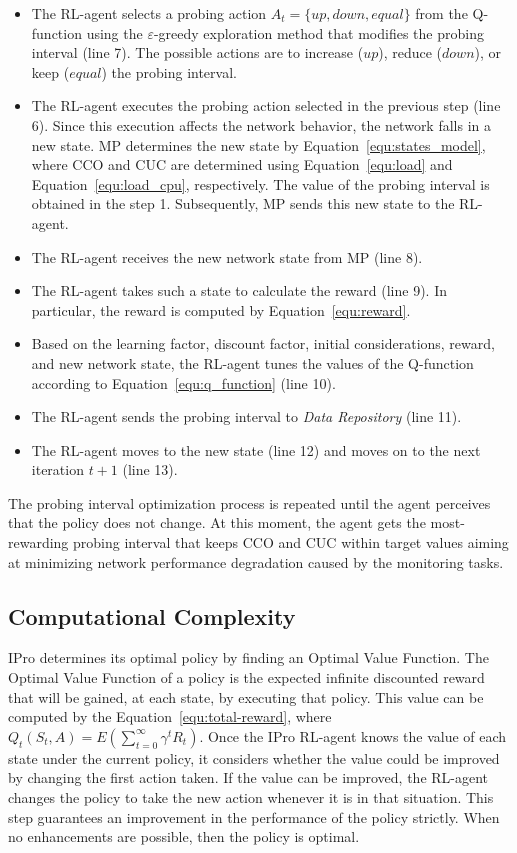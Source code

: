\begin{itemize}
    \item The RL-agent selects a probing action $A_{t}= \{up, down, equal\}$ from the Q-function using the $\varepsilon$-greedy exploration method that modifies the probing interval (line 7). The possible actions are to increase ($up$), reduce ($down$), or keep ($equal$) the probing interval.
    \item The RL-agent executes the probing action selected in the previous step (line 6). Since this execution affects the network behavior, the network falls in a new state. MP determines the new state by Equation~\ref{equ:states_model}, where CCO and CUC are determined using Equation~\ref{equ:load} and Equation~\ref{equ:load_cpu}, respectively. The value of the probing interval is obtained in the step 1. Subsequently, MP sends this new state to the RL-agent.
    \item The RL-agent receives the new network state from MP (line 8). 
    \item The RL-agent takes such a state to calculate the reward (line 9). In particular, the reward is computed by Equation~\ref{equ:reward}.
    \item Based on the learning factor, discount factor, initial considerations, reward, and new network state, the RL-agent tunes the values of the Q-function according to Equation~\ref{equ:q_function} (line 10).
    \item The RL-agent sends the probing interval to \textit{Data Repository} (line 11).
    \item The RL-agent moves to the new state (line 12) and moves on to the next iteration $t+1$ (line 13).
\end{itemize}

The probing interval optimization process is repeated until the agent perceives that the policy does not change. At this moment, the agent gets the most-rewarding probing interval that keeps CCO and CUC within target values aiming at minimizing network performance degradation caused by the monitoring tasks.

\subsection{Computational Complexity}
\label{subsec:computational-complexity}

IPro determines its optimal policy by finding an Optimal Value Function. The Optimal Value Function of a policy is the expected infinite discounted reward that will be gained, at each state, by executing that policy.  This value can be computed by the Equation~\ref{equ:total-reward}, where $Q_{t}(S_{t},A) = E\left ( \sum_{t=0}^{\infty} \gamma^{t}R_{t} \right )$. Once the IPro RL-agent knows the value of each state under the current policy, it considers whether the value could be improved by changing the first action taken. If the value can be improved, the RL-agent changes the policy to take the new action whenever it is in that situation. This step guarantees an improvement in the performance of the policy strictly. When no enhancements are possible, then the policy is optimal.\\

